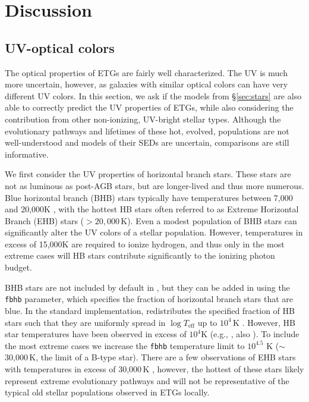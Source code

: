 \section{Discussion}\label{sec:discussion}


\subsection{UV-optical colors}\label{sec:UV}

The optical properties of ETGs are fairly well characterized. The UV is much more uncertain, however, as galaxies with similar optical colors can have very different UV colors. In this section, we ask if the models from \S\ref{sec:stars} are also able to correctly predict the UV properties of ETGs, while also considering the contribution from other non-ionizing, UV-bright stellar types. Although the evolutionary pathways and lifetimes of these hot, evolved, populations are not well-understood and models of their SEDs are uncertain, comparisons are still informative.

We first consider the UV properties of horizontal branch stars. These stars are not as luminous as post-AGB stars, but are longer-lived and thus more numerous. Blue horizontal branch (BHB) stars typically have temperatures between 7,000 and 20,000K \citep[e.g.,][]{Schiavon+2004}, with the hottest HB stars often referred to as Extreme Horizontal Branch (EHB) stars (\Teff$>20,000$\,K). Even a modest population of BHB stars can significantly alter the UV colors of a stellar population. However, temperatures in excess of 15,000K are required to ionize hydrogen, and thus only in the most extreme cases will HB stars contribute significantly to the ionizing photon budget.

BHB stars are not included by default in \FSPS, but they can be added in using the {\tt fbhb} parameter, which specifies the fraction of horizontal branch stars that are blue. In the standard implementation, \FSPS redistributes the specified fraction of HB stars such that they are uniformly spread in $\log T_{\mathrm{eff}}$ up to $10^4$\,K \citep[e.g.,][]{Sarajedini+2007}. However, HB star temperatures have been observed in excess of $10^4$K (e.g., \citealt{Dalessandro+2013}, also \citealt{Catelan+2009}). To include the most extreme cases we increase the {\tt fbhb} temperature limit to $10^{4.5}$ K (${\sim}$30,000$\,$K, the limit of a B-type star). There are a few observations of EHB stars with temperatures in excess of 30,000\,K \citep[][and references therein]{Moehler+2007}, however, the hottest of these stars likely represent extreme evolutionary pathways \citep[e.g., extreme He-enhancement or pop II stars, see][]{Yaron+2017} and will not be representative of the typical old stellar populations observed in ETGs locally.

